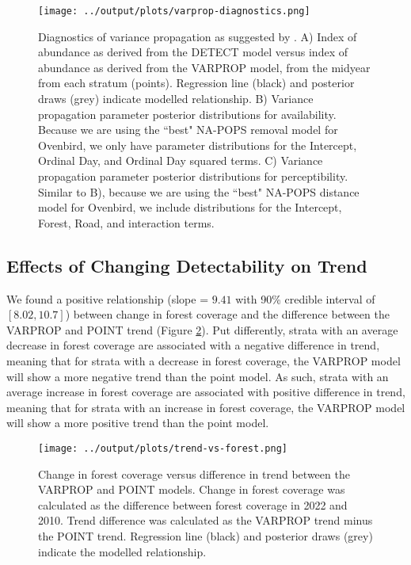 \documentclass[12pt]{article}
\begin{document}
\begin{figure}[h]
	\texttt{[image: ../output/plots/varprop-diagnostics.png]}
	\caption{Diagnostics of variance propagation as suggested by \citet{bravington_variance_2021}. A) Index of abundance as derived from the DETECT model versus index of abundance as derived from the VARPROP model, from the midyear from each stratum (points). Regression line (black) and posterior draws (grey) indicate modelled relationship. B) Variance propagation parameter posterior distributions for availability. Because we are using the ``best" NA-POPS removal model for Ovenbird, we only have parameter distributions for the Intercept, Ordinal Day, and Ordinal Day squared terms. C) Variance propagation parameter posterior distributions for perceptibility. Similar to B), because we are using the ``best" NA-POPS distance model for Ovenbird, we include distributions for the Intercept, Forest, Road, and interaction terms.}
	\label{fig:varprop-diagnostics}
\end{figure}

\subsection{Effects of Changing Detectability on Trend}
\par We found a positive relationship (slope = $9.41$ with 90\% credible interval of $[8.02, 10.7]$) between change in forest coverage and the difference between the VARPROP and POINT trend (Figure \ref{fig:trend-vs-forest}).
Put differently, strata with an average decrease in forest coverage are associated with a negative difference in trend, meaning that for strata with a decrease in forest coverage, the VARPROP model will show a more negative trend than the point model.
As such, strata with an average increase in forest coverage are associated with positive difference in trend, meaning that for strata with an increase in forest coverage, the VARPROP model will show a more positive trend than the point model.

\begin{figure}[h]
	\texttt{[image: ../output/plots/trend-vs-forest.png]}
	\caption{Change in forest coverage versus difference in trend between the VARPROP and POINT models. Change in forest coverage was calculated as the difference between forest coverage in 2022 and 2010. Trend difference was calculated as the VARPROP trend minus the POINT trend. Regression line (black) and posterior draws (grey) indicate the modelled relationship.}
	\label{fig:trend-vs-forest}
\end{figure}
\end{document}
